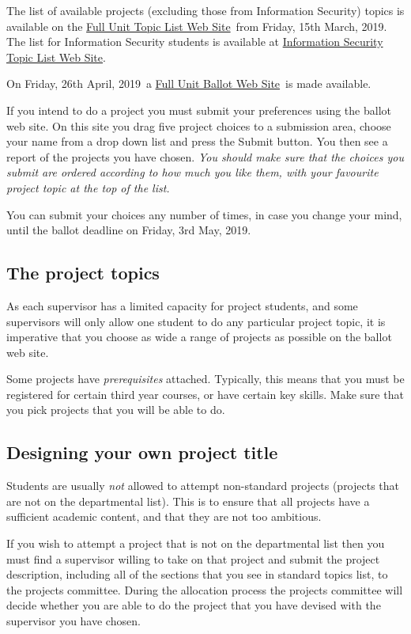 \documentclass[11pt]{article}
\newcommand{\projlistdate}{Friday, 15th March, 2019}
\newcommand{\ballotStartdate}{Friday, 26th April, 2019}
\newcommand{\ballotClosedate}{Friday, 3rd May, 2019}
\newcommand{\projlist}{\href{http://projects.cs.rhul.ac.uk/List.php?PROJECT_TYPE=Full}{Full Unit Topic List Web Site}}
\newcommand{\projlistISG}{\href{http://projects.cs.rhul.ac.uk/List.php?PROJECT_TYPE=ISG}{Information
Security Topic List Web Site}}
\newcommand{\projchoice}{\href{http://projects.cs.rhul.ac.uk/Chooser.php?PROJECT_TYPE=Full}{Full Unit Ballot Web Site}}
\begin{document}
The list of available projects (excluding those from Information
Security) topics  is available on the \projlist\ from \projlistdate. The list for Information Security students is available
at \projlistISG.

 On \ballotStartdate\ a \projchoice\  is made available.

If you intend to do a project you must submit your preferences using the ballot web site.  On this site you drag five project choices to a submission area, choose your name from a drop down list and press the Submit button.  You then see a report of the projects you have chosen. \emph{ You should make sure that the choices you submit are ordered according to how much you like them, with your favourite project topic at the top of the list.}

You can submit your choices any number of times, in case you change your mind, until the ballot deadline on \ballotClosedate.

\subsection{The project topics}
As each supervisor has a limited capacity for project students, and some supervisors will only allow one student to do any particular project topic,
it is imperative that you choose as wide a range of projects as possible on the ballot web site.

Some projects have \emph{prerequisites} attached. Typically, this means that you must be registered for certain third year courses, or have certain key skills.  Make sure that you pick projects that you will be able to do.

\subsection{Designing your own project title}
Students are usually \textit{not} allowed to attempt non-standard projects (projects that are not on the departmental list).  This is to ensure that all projects have a sufficient academic content, and that they are not too ambitious.

If you wish to attempt a project that is not on the departmental list then you must find a supervisor willing to take on that project and submit the project description, including all of the sections that you see in standard topics list, to the projects committee.   During the allocation process the projects committee will decide whether you are able to do the project that you have devised with the supervisor you have chosen.
\end{document}
